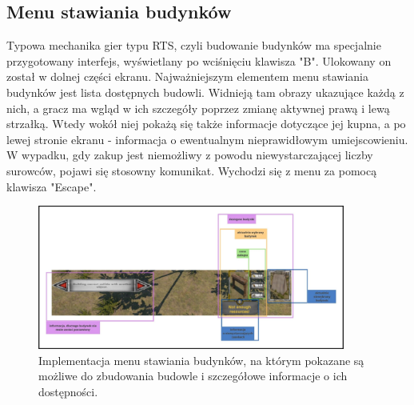 \subsection{Menu stawiania budynków}
Typowa mechanika gier typu RTS, czyli budowanie budynków ma specjalnie przygotowany interfejs, wyświetlany po wciśnięciu klawisza "B". 
Ulokowany on został w dolnej części ekranu. Najważniejszym elementem menu stawiania budynków jest lista dostępnych budowli. Widnieją tam 
obrazy ukazujące każdą z nich, a gracz ma wgląd w ich szczegóły poprzez zmianę aktywnej prawą i lewą strzałką. Wtedy wokół niej pokażą się także informacje dotyczące jej kupna,
a po lewej stronie ekranu - informacja o ewentualnym nieprawidłowym umiejscowieniu. W wypadku, gdy zakup jest niemożliwy z powodu niewystarczającej liczby 
surowców, pojawi się stosowny komunikat. Wychodzi się z menu za pomocą klawisza "Escape".
\begin{figure}[htbp]
    \centering
    \includegraphics[width=0.9\textwidth]{images/ui/opis_ekementow_budowanie.png}
    \caption{Implementacja menu stawiania budynków, na którym pokazane są możliwe do zbudowania budowle 
    i szczegółowe informacje o ich dostępności.
    }\label{fig:compass}
\end{figure}

